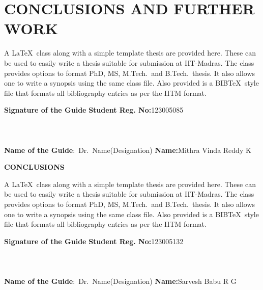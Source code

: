	\chapter{CONCLUSIONS AND FURTHER WORK}
	\label{chap:conclusion}
	
		\noindent A \LaTeX\ class along with a simple template thesis are provided here.  These can be used to easily write a thesis suitable for submission at IIT-Madras.  The class provides options to format PhD, MS, M.Tech.\ and B.Tech.\ thesis.  It also allows one to write a synopsis using the same class file.  Also provided is a BIB\TeX\ style file that formats all bibliography entries as per the IITM format.
	
	
	
	\vspace*{24pt}
	
	\noindent \textbf{Signature of the Guide} \hspace*{70mm} \textbf{Student Reg. No:}123005085\\
		\\
	\\
	\\
\noindent \textbf{Name of the Guide}:~Dr.~Name(Designation) \hspace*{35mm} \textbf{Name:}Mithra Vinda Reddy K
\pagebreak
	\pagebreak
	

	\begin{center}
		\Large{{\textbf{CONCLUSIONS}}}
	\end{center}
	
		\noindent A \LaTeX\ class along with a simple template thesis are provided here.  These can be used to easily write a thesis suitable for submission at IIT-Madras.  The class provides options to format PhD, MS, M.Tech.\ and B.Tech.\ thesis.  It also allows one to write a synopsis using the same class file.  Also provided is a BIB\TeX\ style file that formats all bibliography entries as per the IITM format.
	
	\vspace*{24pt}
	
	\noindent \textbf{Signature of the Guide} \hspace*{70mm} \textbf{Student Reg. No:}123005132\\
		\\
	\\
	\\
\noindent \textbf{Name of the Guide}:~Dr.~Name(Designation) \hspace*{35mm} \textbf{Name:}Sarvesh Babu R G
\pagebreak
	\pagebreak
	
